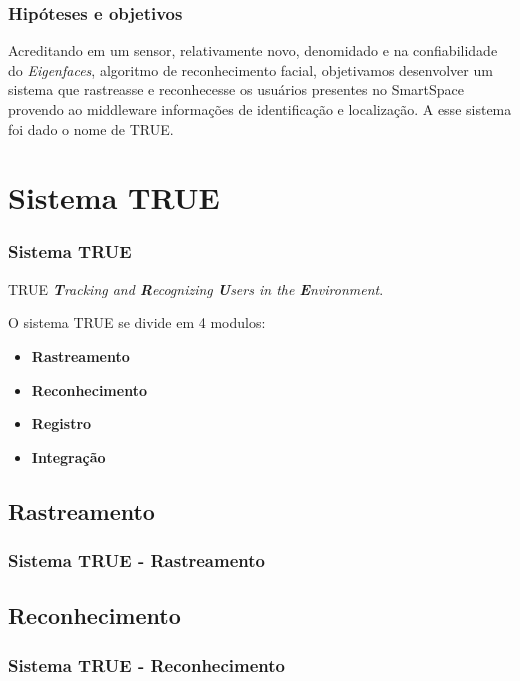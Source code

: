 \documentclass{beamer}
\begin{document}
	\begin{frame}
    	\frametitle{Hipóteses e objetivos}
    	Acreditando em um sensor, relativamente novo, denomidado  e
    	na confiabilidade do \textit{Eigenfaces}, algoritmo de reconhecimento
    	facial, objetivamos desenvolver um sistema que rastreasse e reconhecesse os
    	usuários presentes no SmartSpace provendo ao middleware informações de
    	identificação e localização. A esse sistema foi dado o nome de TRUE.
	\end{frame}
	
\section{Sistema TRUE}

	\begin{frame}
    	\frametitle{Sistema TRUE}
    	
    	TRUE \rightarrow \textit{\textbf{T}racking and \textbf{R}ecognizing
    	\textbf{U}sers in the \textbf{E}nvironment}.
    	
    	O sistema TRUE se divide em 4 modulos:
    		\begin{itemize}
    		  \item \textbf{Rastreamento}
    		  \item \textbf{Reconhecimento}
    		  \item \textbf{Registro}
    		  \item \textbf{Integração}
    		\end{itemize}
    \end{frame}
    
    \subsection{Rastreamento}
		\begin{frame}
	    	\frametitle{Sistema TRUE - Rastreamento}
	    	
	    \end{frame}
    
    \subsection{Reconhecimento}
		\begin{frame}
	    	\frametitle{Sistema TRUE - Reconhecimento}
	    	
	    \end{frame}
    
\end{document}

